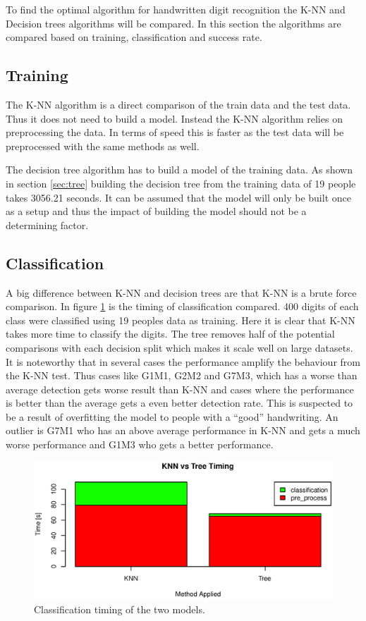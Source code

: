 To find the optimal algorithm for handwritten digit recognition the K-NN and Decision trees algorithms will be compared.
In this section the algorithms are compared based on training, classification and success rate.

\subsection{Training}
The K-NN algorithm is a direct comparison of the train data and the test data.
Thus it does not need to build a model.
Instead the K-NN algorithm relies on preprocessing the data.
In terms of speed this is faster as the test data will be preprocessed with the same methods as well.

The decision tree algorithm has to build a model of the training data. 
As shown in section \ref{sec:tree} building the decision tree from the training data of 19 people takes 3056.21 seconds.
It can be assumed that the model will only be built once as a setup and thus the impact of building the model should not be a determining factor.

\subsection{Classification}
A big difference between K-NN and decision trees are that K-NN is a brute force comparison.
In figure \ref{fig:algo_compare_timing} is the timing of classification compared.
400 digits of each class were classified using 19 peoples data as training.
Here it is clear that K-NN takes more time to classify the digits.
The tree removes half of the potential comparisons with each decision split which makes it scale well on large datasets.
It is noteworthy that in several cases the performance amplify the behaviour from the K-NN test.
Thus cases like G1M1, G2M2 and G7M3, which has a worse than average detection gets worse result than K-NN 
and cases where the performance is better than the average gets a even better detection rate.
This is suspected to be a result of overfitting the model to people with a ``good'' handwriting.
An outlier is G7M1 who has an above average performance in K-NN and gets a much worse performance and G1M3 who gets a better performance.


\begin{figure}[H]
\centering
\includegraphics[width=\textwidth]{graphics/algo_compare_timing}
\caption{Classification timing of the two models.}
\label{fig:algo_compare_timing}
\end{figure}

